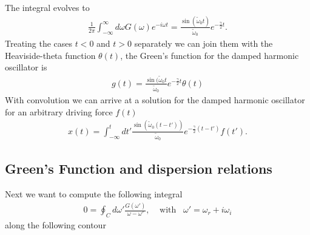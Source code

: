 \documentclass[a4paper]{article}
\begin{document}
The integral evolves to
\begin{align}
    \frac{1}{2\pi} \int_{-\infty}^{\infty} d\omega G(\omega) e^{-i\omega t}=
    \frac{\sin(\tilde{\omega}_0t)}{\tilde{\omega}_0} e^{-\frac{\gamma}{2}t}.
\end{align}
Treating the cases $t<0$ and $t>0$ separately we can join them with the
Heaviside-theta function $\theta(t)$, the Green's function for the damped
harmonic oscillator is
\begin{align}
    g(t) = \frac{\sin(\tilde{\omega}_0t}{\tilde{\omega}_0}
    e^{-\frac{\gamma}{2}t} \theta(t)
\end{align}
With convolution we can arrive at a solution for the damped harmonic oscillator
for an arbitrary driving force $f(t)$
\begin{align}
    x(t) = \int_{-\infty}^{t} dt'
    \frac{\sin(\tilde{\omega}_0 (t-t'))}{\tilde{\omega}_0}
    e^{-\frac{\gamma}{2}(t-t')} f(t').
\end{align}

\subsection{Green's Function and dispersion relations}
Next we want to compute the following integral
\begin{align}
    0 = \oint_C d\omega' \frac{G(\omega')}{\omega - \omega'}, \;\;\;\;
    \text{with} \;\;\; \omega' = \omega_r + i\omega_i
\end{align}
along the following contour
\end{document}
